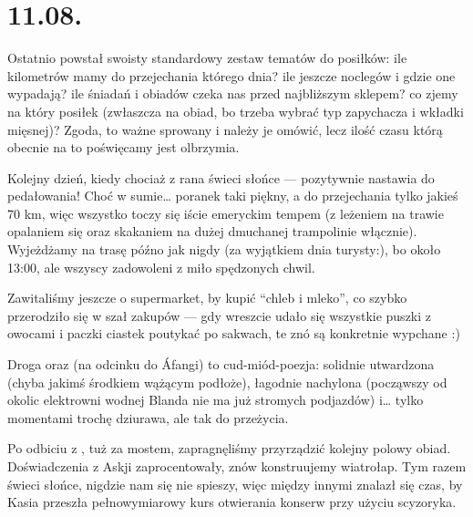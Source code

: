 \chapter*{11.08.}


Ostatnio powstał swoisty standardowy zestaw tematów do posiłków: ile kilometrów mamy do przejechania którego dnia? ile jeszcze noclegów i gdzie one wypadają? ile śniadań i obiadów czeka nas przed najbliższym sklepem? co zjemy na który posiłek (zwłaszcza na obiad, bo trzeba wybrać typ zapychacza i wkładki mięsnej)? Zgoda, to ważne sprowany i należy je omówić, lecz ilość czasu którą obecnie na to poświęcamy jest olbrzymia.

Kolejny dzień, kiedy chociaż z rana świeci słońce --- pozytywnie nastawia do pedałowania! Choć w sumie… poranek taki piękny, a do przejechania tylko jakieś 70 km, więc wszystko toczy się iście emeryckim tempem (z leżeniem na trawie opalaniem się oraz skakaniem na dużej dmuchanej trampolinie włącznie). Wyjeżdżamy na trasę późno jak nigdy (za wyjątkiem dnia turysty:), bo około 13:00, ale wszyscy zadowoleni z miło spędzonych chwil.


Zawitaliśmy jeszcze o supermarket, by kupić “chleb i mleko”, co szybko przerodziło się w szał zakupów --- gdy wreszcie udało się wszystkie puszki z owocami i paczki ciastek poutykać po sakwach, te znó są konkretnie wypchane :)

Droga  oraz  (na odcinku do Áfangi) to cud-miód-poezja: solidnie utwardzona (chyba jakimś środkiem wążącym podłoże), łagodnie nachylona (począwszy od okolic elektrowni wodnej Blanda nie ma już stromych podjazdów) i… tylko momentami trochę dziurawa, ale tak do przeżycia.

Po odbiciu z , tuż za mostem, zapragnęliśmy przyrządzić kolejny polowy obiad. Doświadczenia z Askji zaprocentowały, znów konstruujemy wiatrołap. Tym razem świeci słońce, nigdzie nam się nie spieszy, więc między innymi znalazł się czas, by Kasia przeszła pełnowymiarowy kurs otwierania konserw przy użyciu scyzoryka.

